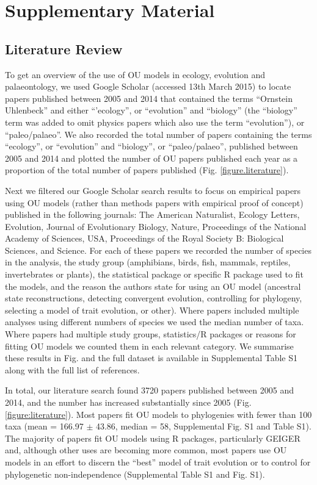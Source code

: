 \section{Supplementary Material}

  \subsection{Literature Review}
    To get an overview of the use of OU models in ecology, evolution and palaeontology, we used Google Scholar (accessed 13th March 2015) to locate papers published between 2005 \citep[when the R package ouch was released;][]{Butler:2004aa} and 2014 that contained the terms ``Ornstein Uhlenbeck'' and either ``'ecology'', or ``evolution'' and ``biology'' (the ``biology'' term was added to omit physics papers which also use the term ``evolution''), or ``paleo/palaeo''. 
    We also recorded the total number of papers containing the terms ``ecology'', or ``evolution'' and ``biology'', or ``paleo/palaeo'', published between 2005 and 2014 and plotted the number of OU papers published each year as a proportion of the total number of papers published (Fig. \ref{figure.literature}). 

    Next we filtered our Google Scholar search results to focus on empirical papers using OU models (rather than methods papers with empirical proof of concept) published in the following journals: The American Naturalist, Ecology Letters, Evolution, Journal of Evolutionary Biology, Nature, Proceedings of the National Academy of Sciences, USA, Proceedings of the Royal Society B: Biological Sciences, and Science. 
    For each of these papers we recorded the number of species in the analysis, the study group (amphibians, birds, fish, mammals, reptiles, invertebrates or plants), the statistical package or specific R package used to fit the models, and the reason the authors state for using an OU model (ancestral state reconstructions, detecting convergent evolution, controlling for phylogeny, selecting a model of trait evolution, or other). 
    Where papers included multiple analyses using different numbers of species we used the median number of taxa. 
    Where papers had multiple study groups, statistics/R packages or reasons for fitting OU models we counted them in each relevant category. 
    We summarise these results in Fig. %
    and the full dataset is available in Supplemental Table S1 along with the full list of references.

    In total, our literature search found 3720 papers published between 2005 and 2014, and the number has increased substantially since 2005 (Fig. \ref{figure:literature}). 
    Most papers fit OU models to phylogenies with fewer than 100 taxa (mean = 166.97 $\pm$ 43.86, median = 58, Supplemental Fig. S1 and Table S1). 
    The majority of papers fit OU models using R packages, particularly GEIGER and, although other uses are becoming more common, most papers use OU models in an effort to discern the “best” model of trait evolution or to control for phylogenetic non-independence (Supplemental Table S1 and Fig. S1). 
 
